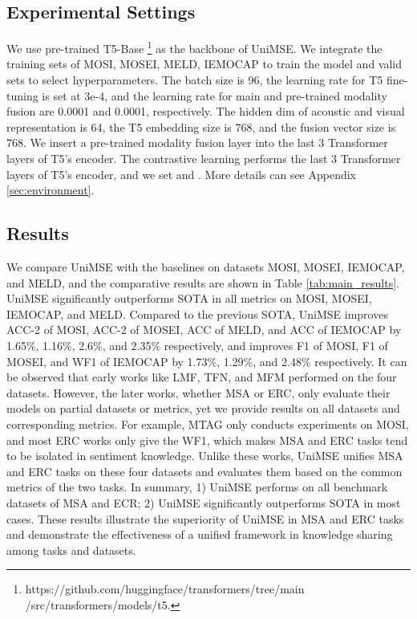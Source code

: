 \documentclass[11pt]{article}
\begin{document}
\subsection{Experimental Settings} We use pre-trained T5-Base \footnote{https://github.com/huggingface/transformers/tree/main\\/src/transformers/models/t5.} as the backbone of UniMSE. We integrate the training sets of {MOSI, MOSEI, MELD, IEMOCAP} to train the model and valid sets to select hyperparameters. The batch size is 96, the learning rate for T5 fine-tuning is set at 3e-4, and the learning rate for main and pre-trained modality fusion are 0.0001 and 0.0001, respectively. The hidden dim of acoustic and visual representation is 64, the T5 embedding size is 768, and the fusion vector size is 768. We insert a pre-trained modality fusion layer into the last 3 Transformer layers of T5's encoder. The contrastive learning performs the last 3 Transformer layers of T5's encoder, and we set  and . More details can see Appendix \ref{sec:environment}.

\subsection{Results}

We compare UniMSE with the baselines on datasets MOSI, MOSEI, IEMOCAP, and MELD, and the comparative results are shown in Table \ref{tab:main_results}.
UniMSE significantly outperforms SOTA in all metrics on MOSI, MOSEI, IEMOCAP, and MELD. Compared to the previous SOTA, UniMSE improves ACC-2 of MOSI, ACC-2 of MOSEI, ACC of MELD, and ACC of IEMOCAP by 1.65\%, 1.16\%, 2.6\%, and 2.35\% respectively, and improves F1 of MOSI, F1 of MOSEI, and WF1 of IEMOCAP by 1.73\%, 1.29\%, and 2.48\% respectively.
It can be observed that early works like LMF, TFN, and MFM performed on the four datasets. However, the later works, whether MSA or ERC, only evaluate their models on partial datasets or metrics, yet we provide results on all datasets and corresponding metrics. For example, MTAG only conducts experiments on MOSI, and most ERC works only give the WF1, which makes MSA and ERC tasks tend to be isolated in sentiment knowledge. Unlike these works, UniMSE unifies MSA and ERC tasks on these four datasets and evaluates them based on the common metrics of the two tasks. In summary, 1) UniMSE performs on all benchmark datasets of MSA and ECR; 2) UniMSE significantly outperforms SOTA in most cases. These results illustrate the superiority of UniMSE in MSA and ERC tasks and demonstrate the effectiveness of a unified framework in knowledge sharing among tasks and datasets.
\end{document}
